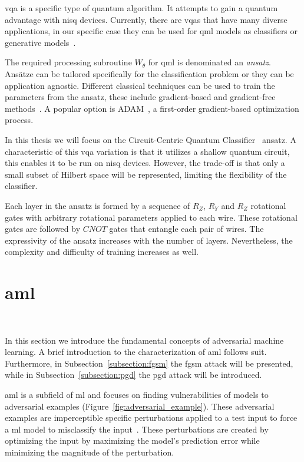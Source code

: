 \ac{vqa} is a specific type of quantum algorithm. It attempts to
gain a quantum advantage with \ac{nisq} devices. Currently, there
are \ac{vqa}s that have many diverse applications, in our specific
case they can be used for \ac{qml} models as classifiers or
generative models~\cite{cerezo_variational_2021}.\

The required processing subroutine \(W_{\theta}\) for \ac{qml}
is denominated an \textit{ansatz}. Ansätze can be tailored specifically
for the classification problem or they can be application agnostic.
Different classical techniques can be used to train the parameters
from the ansatz, these include gradient-based and gradient-free
methods~\cite{benedetti_parameterized_2019}. A popular option is
ADAM~\cite{kingma_adam_2017}, a first-order gradient-based
optimization process. \

In this thesis we will focus on the Circuit-Centric Quantum
Classifier~\cite{schuld_circuit-centric_2020} ansatz. A
characteristic of this \ac{vqa} variation is that it utilizes
a shallow quantum circuit, this enables it to be run on \ac{nisq}
devices. However, the trade-off is that only a small
subset of Hilbert space will be represented, limiting the
flexibility of the classifier. \

Each layer in the ansatz is formed by a sequence of \(R_{Z}\),
\(R_{Y}\) and \(R_{Z}\) rotational gates with arbitrary
rotational parameters applied to each wire. These rotational
gates are followed by \(CNOT\) gates that entangle each pair
of wires. The expressivity of the ansatz increases with the
number of layers. Nevertheless, the complexity and difficulty
of training increases as well. \

\section{\acl{aml}}\label{section:aml} \

In this section we introduce the fundamental concepts of
adversarial machine learning. A brief introduction
to the characterization of \ac{aml} follows suit. Furthermore,
in Subsection~\ref{subsection:fgsm} the \ac{fgsm}
attack will be presented, while in Subsection~\ref{subsection:pgd}
the \ac{pgd} attack will be introduced. \

\acl{aml} is a subfield of \ac{ml} and focuses on finding vulnerabilities of
models to adversarial examples (Figure~\ref{fig:adversarial_example}).
These adversarial examples are imperceptible specific perturbations
applied to a test input to force a \ac{ml} model to misclassify the
input~\cite{szegedy_intriguing_2014}. These perturbations are created
by optimizing the input by maximizing the model's prediction error
while minimizing the magnitude of the perturbation. \

